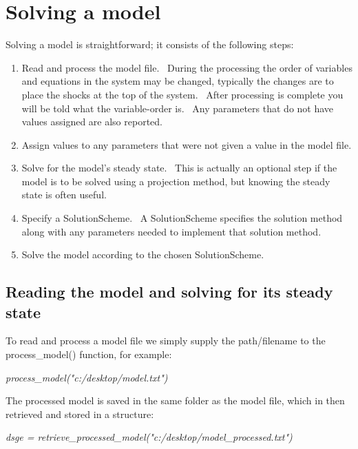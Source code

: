 \documentclass[notitlepage,11pt]{article}
\begin{document}
\section{Solving a model}

Solving a model is straightforward; it consists of the following steps:

\begin{enumerate}
\item Read and process the model file. \ During the processing the order of
variables and equations in the system may be changed, typically the changes
are to place the shocks at the top of the system. \ After processing is
complete you will be told what the variable-order is. \ Any parameters that
do not have values assigned are also reported.

\item Assign values to any parameters that were not given a value in the
model file.

\item Solve for the model's steady state. \ This is actually an optional
step if the model is to be solved using a projection method, but knowing the
steady state is often useful.

\item Specify a SolutionScheme. \ A SolutionScheme specifies the solution
method along with any parameters needed to implement that solution method.

\item Solve the model according to the chosen SolutionScheme.
\end{enumerate}

\subsection{Reading the model and solving for its steady state}

To read and process a model file we simply supply the path/filename to the
process\_model() function, for example:

\bigskip

\textit{process\_model("c:/desktop/model.txt")}

\bigskip

The processed model is saved in the same folder as the model file, which in
then retrieved and stored in a structure:

\bigskip

\textit{dsge = retrieve\_processed\_model("c:/desktop/model\_processed.txt")}
\end{document}
